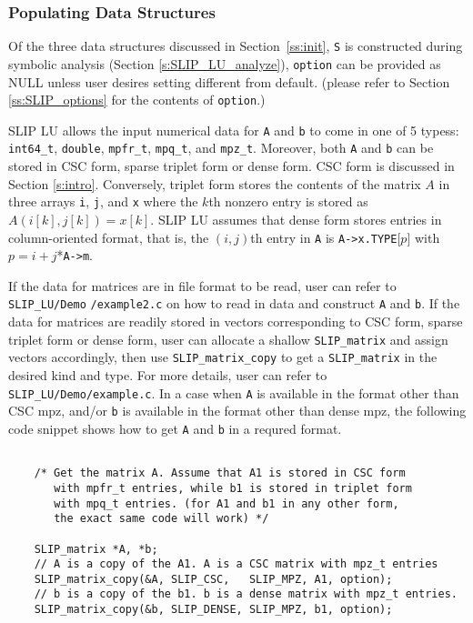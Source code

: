 \documentclass[12pt]{article}
\theoremstyle{definition}
\begin{document}
\subsubsection{Populating Data Structures}
\label{ss:populate_Ab}

Of the three data structures discussed in Section~\ref{ss:init}, \verb|S| is
constructed during symbolic analysis (Section \ref{s:SLIP_LU_analyze}),
\verb|option| can be provided as NULL unless user desires setting different
from default.  (please refer to Section \ref{ss:SLIP_options} for the contents
of \verb|option|.)

SLIP LU allows the input numerical data for \verb|A| and \verb|b| to come in
one of 5 typess: \verb|int64_t|, \verb|double|, \verb|mpfr_t|, \verb|mpq_t|,
and \verb|mpz_t|. Moreover, both \verb|A| and \verb|b| can be stored in
CSC form, sparse triplet form or dense form. CSC form is discussed in Section
\ref{s:intro}. Conversely, triplet form stores the contents of the matrix $A$
in three arrays \verb|i|, \verb|j|, and \verb|x| where the $k$th nonzero entry
is stored as $A ( i[k], j[k]) = x[k]$. SLIP LU assumes that dense form stores
entries in column-oriented format, that is, the $(i,j)$th entry in \verb|A|
is \verb|A->x.TYPE|[$p$] with $p = i+j$*\verb|A->m|.

If the data for matrices are in file format to be read, user can refer to
\verb|SLIP_LU/Demo| \verb|/example2.c| on how to read in data and construct \verb|A| and
\verb|b|. If the data for matrices are readily stored in vectors corresponding
to CSC form, sparse triplet form or dense form, user can allocate a shallow
\verb|SLIP_matrix| and assign vectors accordingly, then use
\verb|SLIP_matrix_copy| to get a \verb|SLIP_matrix| in the desired kind and
type. For more details, user can refer to \verb|SLIP_LU/Demo/example.c|. In a case
when \verb|A| is available in the format other than CSC mpz, and/or \verb|b|
is available in the format other than dense mpz, the following code snippet
shows how to get \verb|A| and \verb|b| in a requred format.

{\small
\begin{verbatim}

    /* Get the matrix A. Assume that A1 is stored in CSC form
       with mpfr_t entries, while b1 is stored in triplet form
       with mpq_t entries. (for A1 and b1 in any other form,
       the exact same code will work) */

    SLIP_matrix *A, *b;
    // A is a copy of the A1. A is a CSC matrix with mpz_t entries
    SLIP_matrix_copy(&A, SLIP_CSC,   SLIP_MPZ, A1, option);
    // b is a copy of the b1. b is a dense matrix with mpz_t entries. 
    SLIP_matrix_copy(&b, SLIP_DENSE, SLIP_MPZ, b1, option);
    \end{verbatim} }
\end{document}
